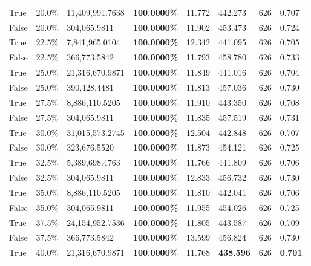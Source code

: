 \begin{table}[H]
\begin{tabular}{lllrllll}
\cline{1-8}
True & 20.0\% & 11,409,991.7638 & \bfseries \color{red} 100.0000\% & 11.772 & 442.273 & 626 & 0.707 \\
\cline{1-8}
False & 20.0\% & \color{red} 304,065.9811 & \bfseries \color{red} 100.0000\% & 11.902 & 453.473 & 626 & 0.724 \\
\cline{1-8}
True & 22.5\% & 7,841,965.0104 & \bfseries \color{red} 100.0000\% & 12.342 & 441.095 & 626 & 0.705 \\
\cline{1-8}
False & 22.5\% & 366,773.5842 & \bfseries \color{red} 100.0000\% & 11.793 & 458.780 & 626 & 0.733 \\
\cline{1-8}
True & 25.0\% & 21,316,670.9871 & \bfseries \color{red} 100.0000\% & 11.849 & 441.016 & 626 & 0.704 \\
\cline{1-8}
False & 25.0\% & 390,428.4481 & \bfseries \color{red} 100.0000\% & 11.813 & 457.036 & 626 & 0.730 \\
\cline{1-8}
True & 27.5\% & 8,886,110.5205 & \bfseries \color{red} 100.0000\% & 11.910 & 443.350 & 626 & 0.708 \\
\cline{1-8}
False & 27.5\% & \color{red} 304,065.9811 & \bfseries \color{red} 100.0000\% & 11.835 & 457.519 & 626 & 0.731 \\
\cline{1-8}
True & 30.0\% & 31,015,573.2745 & \bfseries \color{red} 100.0000\% & 12.504 & 442.848 & 626 & 0.707 \\
\cline{1-8}
False & 30.0\% & 323,676.5520 & \bfseries \color{red} 100.0000\% & 11.873 & 454.121 & 626 & 0.725 \\
\cline{1-8}
True & 32.5\% & 5,389,698.4763 & \bfseries \color{red} 100.0000\% & 11.766 & 441.809 & 626 & 0.706 \\
\cline{1-8}
False & 32.5\% & \color{red} 304,065.9811 & \bfseries \color{red} 100.0000\% & 12.833 & 456.732 & 626 & 0.730 \\
\cline{1-8}
True & 35.0\% & 8,886,110.5205 & \bfseries \color{red} 100.0000\% & 11.810 & 442.041 & 626 & 0.706 \\
\cline{1-8}
False & 35.0\% & \color{red} 304,065.9811 & \bfseries \color{red} 100.0000\% & 11.955 & 454.026 & 626 & 0.725 \\
\cline{1-8}
True & 37.5\% & 24,154,952.7536 & \bfseries \color{red} 100.0000\% & 11.805 & 443.587 & 626 & 0.709 \\
\cline{1-8}
False & 37.5\% & 366,773.5842 & \bfseries \color{red} 100.0000\% & 13.599 & 456.824 & 626 & 0.730 \\
\cline{1-8}
True & 40.0\% & 21,316,670.9871 & \bfseries \color{red} 100.0000\% & 11.768 & \bfseries \color{red} 438.596 & 626 & \bfseries \color{red} 0.701 \\

\end{tabular}
\end{table}
